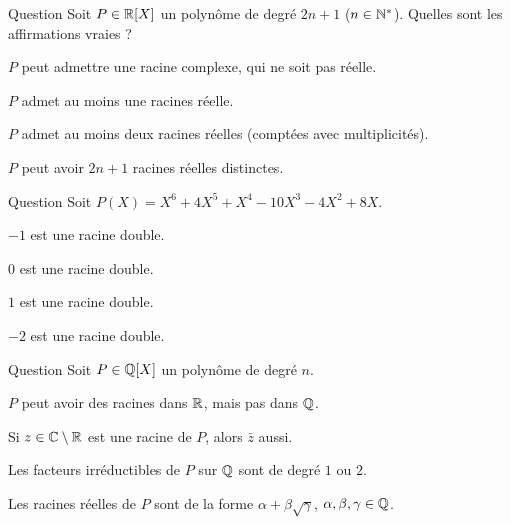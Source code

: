 \begin{multi}[multiple,feedback=
{Il y a au plus \(\deg P\) racines réelles (comptées avec multiplicité). Mais ici le degré est impair, donc \(P\) admet au moins une racine réelle.
}]{Question}
Soit \(P \in \mathbb{R}[X]\) un polynôme de degré \(2n+1\) (\(n\in\mathbb{N}^*\)).
Quelles sont les affirmations vraies ?

    \item* \(P\) peut admettre une racine complexe, qui ne soit pas réelle.
    \item* \(P\) admet au moins une racines réelle.
    \item \(P\) admet au moins deux racines réelles (comptées avec multiplicités).
    \item* \(P\) peut avoir \(2n+1\) racines réelles distinctes.
\end{multi}


\begin{multi}[multiple,feedback=
{Pour une racine double il faut \(P(a)=0\), \(P'(a)=0\) et \(P''(a)\neq0\).
En fait \(P(X) = X(X+2)^3(X-1)^2\).
}]{Question}
Soit \(P(X) = X^6 + 4 X^5 + X^4 - 10 X^3 - 4 X^2 + 8 X\).

    \item \(-1\) est une racine double.
    \item \(0\) est une racine double.
    \item* \(1\) est une racine double.
    \item \(-2\) est une racine double.
\end{multi}


\begin{multi}[multiple,feedback=
{Sur \(\Qq\) les facteurs irréductibles peuvent être de n'importe quel degré.
}]{Question}
Soit \(P \in \mathbb{Q}[X]\) un polynôme de degré \(n\).

    \item* \(P\) peut avoir des racines dans \(\mathbb{R}\), mais pas dans \(\Qq\).
    \item* Si \(z\in \mathbb{C}\setminus\mathbb{R}\) est une racine de \(P\), alors \(\bar z\) aussi.
    \item Les facteurs irréductibles de \(P\) sur \(\Qq\) sont de degré \(1\) ou \(2\).
    \item Les racines réelles de \(P\) sont de la forme \(\alpha + \beta\sqrt{\gamma}\), \(\alpha,\beta,\gamma \in \mathbb{Q}\).
\end{multi}


